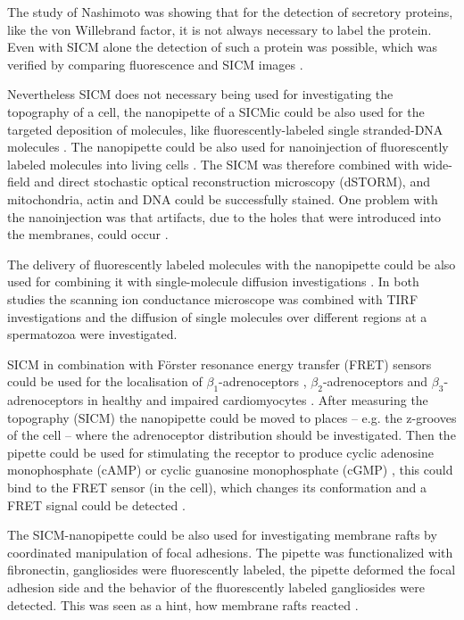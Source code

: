 The study of Nashimoto was showing that for the detection of secretory proteins, like the von 
Willebrand factor, it is not always necessary to label the protein. Even with SICM alone the 
detection of such a protein was possible, which was verified by comparing fluorescence and SICM 
images \cite{Nashimoto2015}.

Nevertheless SICM does not necessary being used for investigating the topography of a cell, 
the nanopipette of a SICMic could be also used for the targeted deposition of molecules, like 
fluorescently-labeled single stranded-DNA molecules \cite{Ying2002,Hennig2015}. The nanopipette 
could be also used for nanoinjection of fluorescently labeled molecules into living cells 
\cite{Hennig2015a}. The SICM was therefore combined with wide-field and direct stochastic 
optical reconstruction microscopy (dSTORM), and mitochondria, actin and DNA could be successfully 
stained. One problem with the nanoinjection was that artifacts, due to the holes that were 
introduced into the membranes, could occur \cite{Hennig2015a}.

The delivery of fluorescently labeled molecules with the nanopipette could be also used for 
combining it with single-molecule diffusion investigations \cite{Bruckbauer2007, Bruckbauer2010}. 
In both studies the scanning ion conductance microscope was combined with TIRF investigations and 
the diffusion of single molecules over different regions at a spermatozoa were investigated. 

SICM in combination with Förster resonance energy transfer (FRET) sensors could be used for
the localisation of $\beta_{1}$-adrenoceptors \cite{Wright2018}, $\beta_{2}$-adrenoceptors 
\cite{Nikolaev2010,Lyon2012,Wright2014,Wright2018} and $\beta_{3}$-adrenoceptors 
\cite{Schobesberger2020} in healthy and impaired cardiomyocytes \cite{Wright2015,Berisha2017}. 
After measuring the topography (SICM) the nanopipette could be moved to places -- e.g. the 
z-grooves of the cell \cite{Gorelik2006,Lyon2009,Miragoli2011,Lyon2012,Rivaud2017} -- where the 
adrenoceptor distribution should be investigated. Then the pipette could be used for stimulating 
the receptor to produce cyclic adenosine monophosphate (cAMP) or cyclic guanosine monophosphate 
(cGMP) \cite{Xiang2003}, this could bind to the FRET sensor (in the cell), which changes its 
conformation and a FRET signal could be detected \cite{Nikolaev2010}.

The SICM-nanopipette could be also used for investigating membrane rafts 
\cite{Simons1997,Pike2006} by coordinated manipulation of focal adhesions. The pipette was 
functionalized with fibronectin, gangliosides were fluorescently labeled, the pipette deformed the 
focal adhesion side and the behavior of the fluorescently labeled gangliosides were detected. This 
was seen as a hint, how membrane rafts reacted \cite{Fuentes2012}. 

